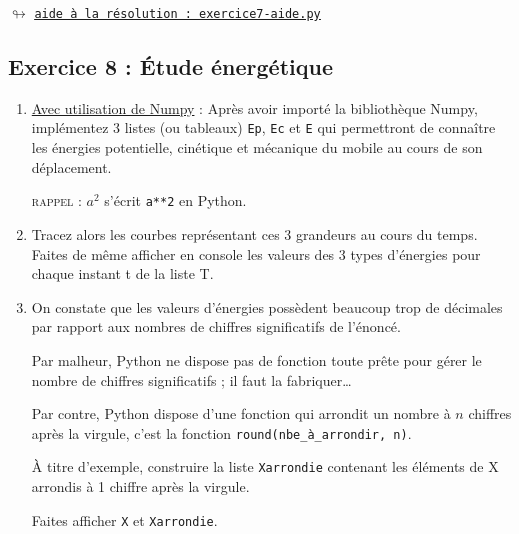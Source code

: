 \documentclass[11pt]{article}
\begin{document}
 
 
 
 
 
 \begin{center}
 $\looparrowright$ \href{https://github.com/formationPythonPC-Juin/aides-formation/blob/master/exercice7-aide.py}{\underline{\texttt{aide à la résolution : exercice7-aide.py}}}
\end{center}
 
 








 
 
 
 
 
 
 
 
 
 
 
 
 
 
 
 
 
 
 
 
 
 \subsection{Exercice 8 : Étude énergétique}
 
 \begin{enumerate}

 
 \item \underline{Avec utilisation de Numpy} : Après avoir importé la bibliothèque Numpy, implémentez 3 listes (ou tableaux) \texttt{Ep}, \texttt{Ec} et \texttt{E} qui permettront de connaître les énergies potentielle, cinétique et mécanique du mobile au cours de son déplacement.

 
 \textsc{rappel : } $a^2$ s'écrit \texttt{a**2} en Python.
 
 
 \item Tracez alors les courbes représentant ces 3 grandeurs au cours du temps. Faites de même afficher en console les valeurs des 3 types d'énergies pour chaque instant t de la liste T.
 
 \item On constate que les valeurs d'énergies possèdent beaucoup trop de décimales par rapport aux nombres de chiffres significatifs de l'énoncé.
 
 \smallskip
 Par malheur, Python ne dispose pas de fonction toute prête pour gérer le nombre de chiffres significatifs ; il faut la fabriquer\ldots
 
 \smallskip
 Par contre, Python dispose d'une fonction qui arrondit un nombre à $n$ chiffres après la virgule, c'est la fonction \texttt{round(nbe\_à\_arrondir, n)}.
 
 \smallskip
 À titre d'exemple, construire la liste \texttt{Xarrondie} contenant les éléments de X arrondis à 1 chiffre après la virgule.
 
 \smallskip
 Faites afficher \texttt{X} et \texttt{Xarrondie}.
 
\end{enumerate}
\end{document}
